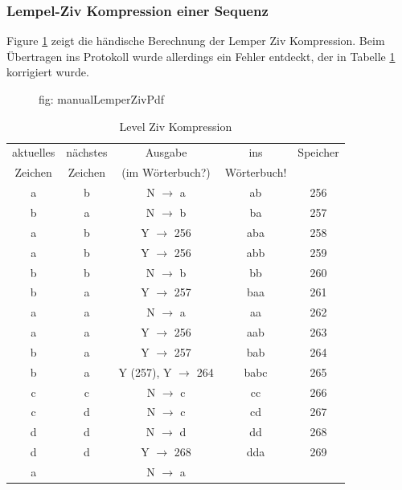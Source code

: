 \documentclass[12pt,german]{article}
\begin{document}
\subsubsection{Lempel-Ziv Kompression einer Sequenz}
Figure \ref{fig: manualLemperZivPdf} zeigt die händische Berechnung der Lemper Ziv Kompression. Beim Übertragen ins Protokoll wurde allerdings ein Fehler entdeckt, der in Tabelle \ref{tab:Level Ziv Kompression} korrigiert wurde.


\begin{figure}[H]
	
	\label{fig: manualLemperZivPdf}
	\caption{fig: manualLemperZivPdf}
\end{figure}

\begin{table}[H]
  \centering
  \begin{tabular}{c | c | c | c | c |}
    \hline
   	aktuelles  & nächstes  & Ausgabe  & ins & Speicher \\
   	 Zeichen &  Zeichen &  (im Wörterbuch?) & Wörterbuch! &  \\
	a & b & N $ \rightarrow $ a & ab & 256 \\
	b & a & N $ \rightarrow $ b & ba & 257 \\
	a & b & Y $ \rightarrow $ 256 & aba & 258 \\
	a & b & Y $ \rightarrow $ 256 & abb & 259 \\
	b & b & N $ \rightarrow $ b & bb & 260 \\
	b & a & Y $ \rightarrow $ 257 & baa & 261 \\
	a & a & N $ \rightarrow $ a & aa & 262 \\
	a & a & Y $ \rightarrow $ 256 & aab & 263 \\
	b & a & Y $ \rightarrow $ 257 & bab & 264 \\
	b & a & Y (257), Y $ \rightarrow $ 264 & babc & 265 \\
	c & c & N $ \rightarrow $ c & cc & 266 \\
	c & d & N $ \rightarrow $ c & cd & 267 \\
	d & d & N $ \rightarrow $ d & dd & 268 \\
	d & d & Y $ \rightarrow $ 268 & dda & 269 \\
	a &   & N $ \rightarrow $ a &     &   \\ 
   	
  \end{tabular}
  \caption{Level Ziv Kompression}
  \label{tab:Level Ziv Kompression}
\end{table}
\end{document}
